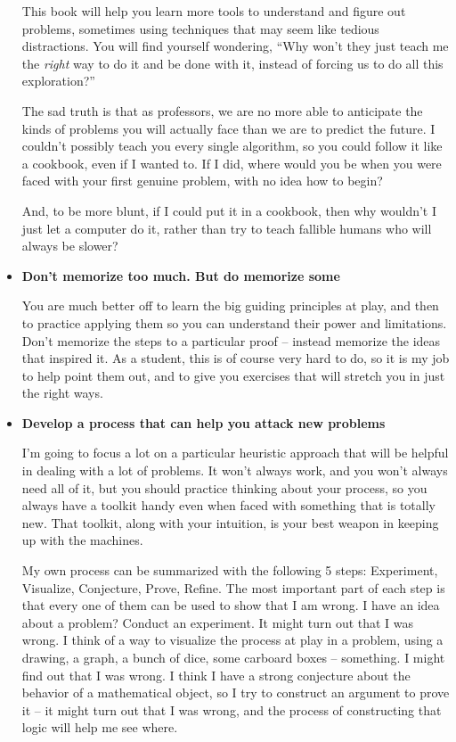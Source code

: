 \begin{itemize}
  This book will help you learn more tools to understand and figure
  out problems, sometimes using techniques that may seem like tedious
  distractions.  You will find yourself wondering, ``Why won't they
  just teach me the \emph{right} way to do it and be done with it,
  instead of forcing us to do all this exploration?''

  The sad truth is that as professors, we are no more able to
  anticipate the kinds of problems you will actually face than we are
  to predict the future.  I couldn't possibly teach you every single
  algorithm, so you could follow it like a cookbook, even if I wanted
  to.  If I did, where would you be when you were faced with your
  first genuine problem, with no idea how to begin?

  And, to be more blunt, if I could put it in a cookbook, then why
  wouldn't I just let a computer do it, rather than try to teach
  fallible humans who will always be slower?

\item \textbf{Don't memorize too much.  But do memorize some}

  You are much better off to learn the big guiding principles at play,
  and then to practice applying them so you can understand their power
  and limitations.  Don't memorize the steps to a particular proof --
  instead memorize the ideas that inspired it.  As a student, this is
  of course very hard to do, so it is my job to help point them out,
  and to give you exercises that will stretch you in just the right
  ways.

\item \textbf{Develop a process that can help you attack new problems}

  I'm going to focus a lot on a particular heuristic approach that
  will be helpful in dealing with a lot of problems.  It won't always
  work, and you won't always need all of it, but you should practice
  thinking about your process, so you always have a toolkit handy even
  when faced with something that is totally new.  That toolkit, along
  with your intuition, is your best weapon in keeping up with the
  machines.

  My own process can be summarized with the following 5 steps:
  Experiment, Visualize, Conjecture, Prove, Refine.  The most
  important part of each step is that every one of them can be used to
  show that I am wrong.  I have an idea about a problem?  Conduct an
  experiment.  It might turn out that I was wrong.  I think of a way
  to visualize the process at play in a problem, using a drawing, a
  graph, a bunch of dice, some carboard boxes -- something.  I might
  find out that I was wrong.  I think I have a strong conjecture about
  the behavior of a mathematical object, so I try to construct an
  argument to prove it -- it might turn out that I was wrong, and the
  process of constructing that logic will help me see where.


\end{itemize}
